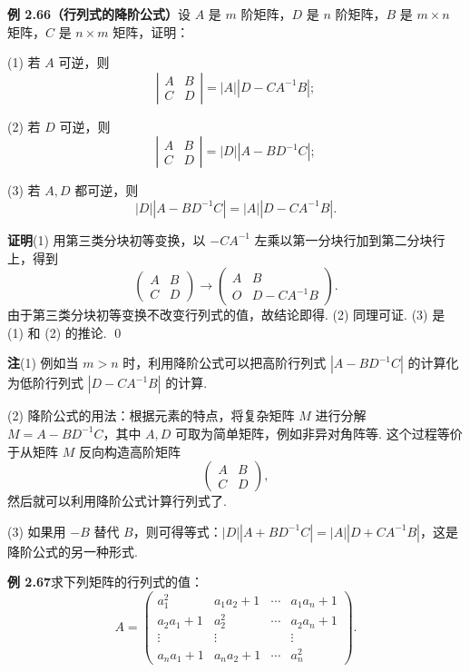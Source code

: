 \documentclass[UTF8, 12pt, fontset=fandol, oneside]{ctexart}
\begin{document}
\noindent\textbf{例 2.66（行列式的降阶公式）}\quad 设 $A$ 是 $m$ 阶矩阵，$D$ 是 $n$ 阶矩阵，$B$ 是 $m\times n$ 矩阵，$C$ 是 $n\times m$ 矩阵，证明：

(1) 若 $A$ 可逆，则
\[
\left|
\begin{array}{cc}
A & B\\
C & D
\end{array}
\right|
=|A||D-CA^{-1}B|;
\]

(2) 若 $D$ 可逆，则
\[
\left|
\begin{array}{cc}
A & B\\
C & D
\end{array}
\right|
=|D||A-BD^{-1}C|;
\]

(3) 若 $A,D$ 都可逆，则
\[
|D||A-BD^{-1}C|=|A||D-CA^{-1}B|.
\]

\noindent\textbf{证明}\quad (1) 用第三类分块初等变换，以 $-CA^{-1}$ 左乘以第一分块行加到第二分块行上，得到
\[
\left(
\begin{array}{cc}
A & B\\
C & D
\end{array}
\right)
\to
\left(
\begin{array}{cc}
A & B\\
O & D-CA^{-1}B
\end{array}
\right).
\]
由于第三类分块初等变换不改变行列式的值，故结论即得. (2) 同理可证. (3) 是 (1) 和 (2) 的推论. \qed

\noindent\textbf{注}\quad (1) 例如当 $m>n$ 时，利用降阶公式可以把高阶行列式 $|A-BD^{-1}C|$ 的计算化为低阶行列式 $|D-CA^{-1}B|$ 的计算.

(2) 降阶公式的用法：根据元素的特点，将复杂矩阵 $M$ 进行分解 $M=A-BD^{-1}C$，其中 $A,D$ 可取为简单矩阵，例如非异对角阵等. 这个过程等价于从矩阵 $M$ 反向构造高阶矩阵
\[
\left(
\begin{array}{cc}
A & B\\
C & D
\end{array}
\right),
\]
然后就可以利用降阶公式计算行列式了.

(3) 如果用 $-B$ 替代 $B$，则可得等式：$|D||A+BD^{-1}C|=|A||D+CA^{-1}B|$，这是降阶公式的另一种形式.

\noindent\textbf{例 2.67}\quad 求下列矩阵的行列式的值：
\[
A=
\left(
\begin{array}{cccc}
a_1^2 & a_1a_2+1 & \cdots & a_1a_n+1\\
a_2a_1+1 & a_2^2 & \cdots & a_2a_n+1\\
\vdots & \vdots & & \vdots\\
a_na_1+1 & a_na_2+1 & \cdots & a_n^2
\end{array}
\right).
\]
\end{document}
